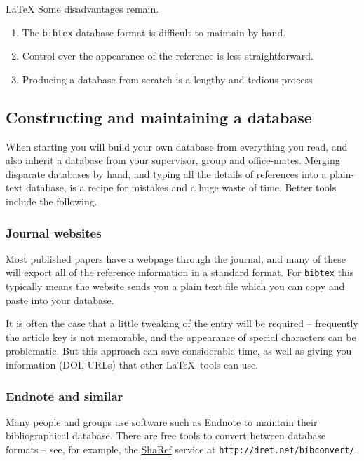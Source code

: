 \begin{chapter}{\LaTeX}
Some disadvantages remain.
%
\begin{enumerate}
\item The \verb|bibtex| database format is difficult to maintain by hand.
\item Control over the appearance of the reference is less straightforward.
\item Producing a database from scratch is a lengthy and tedious process.
\end{enumerate}

\subsection{Constructing and maintaining a database}
\label{sec:maintaining}

When starting you will build your own database from everything you read, and also inherit a database from your supervisor, group and office-mates. Merging disparate databases by hand, and typing all the details of references into a plain-text database, is a recipe for mistakes and a huge waste of time. Better tools include the following.

\subsubsection{Journal websites}
\label{sec:journals}

Most published papers have a webpage through the journal, and many of these will export all of the reference information in a standard format. For \verb|bibtex| this typically means the website sends you a plain text file which you can copy and paste into your database.

It is often the case that a little tweaking of the entry will be required -- frequently the article key is not memorable, and the appearance of special characters can be problematic. But this approach can save considerable time, as well as giving you information (DOI, URLs) that other \LaTeX\ tools can use.

\subsubsection{Endnote and similar}
\label{sec:endnote}

Many people and groups use software such as \href{http://www.endnote.com/}{Endnote} to maintain their bibliographical database. There are free tools to convert between database formats -- see, for example, the \href{http://dret.net/bibconvert/}{ShaRef} service at \verb|http://dret.net/bibconvert/|.


\end{chapter}
